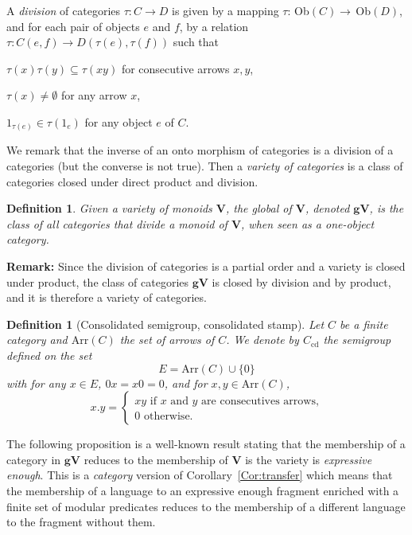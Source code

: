 \documentclass[submission,hidelink]{dmtcs-episciences}
\newtheorem{definition}[theorem]{Definition}
\newcommand{\V}{\mathbf{V}}
\newcommand{\gV}{\mathbf{gV}}
\newcommand{\cd}{\textrm{cd}}
\newcommand{\Ob}{$\,\textrm{Ob}$}
\newenvironment{conditions}
{\begin{list}{\rm (\theenumi)}{\noindent \usecounter{enumi}\setlength{\topsep}{2pt}\setlength{\partopsep}{0pt}\setlength{\itemsep}{2pt}\setlength{\parsep}{0pt}\setlength{\leftmargin}{2.5em}\setlength{\labelwidth}{1.5em}\setlength{\labelsep}{0.5em}\setlength{\listparindent}{0pt}\setlength{\itemindent}{0pt}}}{\end{list}}
\newcommand{\Arr}{\textrm{Arr}}
\begin{document}
		A \emph{division} of categories $\tau:C\to D$
		is given by a mapping $\tau:\Ob(C)\to \Ob(D)$,
		and for each pair of objects $e$ and $f$, by a relation $\tau: C(e,f)\to D(\tau(e),\tau(f))$
		such that
			\begin{conditions}
			\item $\tau(x)\tau(y)\subseteq\tau(xy)$ for consecutive arrows $x,y$,
			\item $\tau(x)\neq \emptyset$ for any arrow $x$,
			\item $1_{\tau(e)}\in\tau(1_e)$ for any object $e$ of $C$.
			\end{conditions}
	We remark that the inverse of an onto morphism of categories is a division of a categories (but the converse is not
	true).
	Then a \emph{variety of categories} is a class of categories closed under direct product and division.

	\begin{definition}
		Given a variety of monoids $\V$, the \emph{global} of $\V$, denoted $\gV$, is the class of all categories that divide a monoid of $\V$, when seen as a one-object category.
\end{definition}

	\noindent\textbf{Remark:} Since the division of categories is a partial order and a variety is closed under product, the class of categories $\gV$ is closed by division and by product, and it is therefore a variety of categories.

	\begin{definition}[Consolidated semigroup, consolidated stamp]
			Let $C$ be a finite category and $\Arr(C)$
			the set of arrows of $C$. We denote by $C_\cd$ the semigroup
			defined on the set
			$$E=\Arr(C) \cup \{0\}$$
			with   for any $x\in E$, $0x = x0 = 0$, and for $x,y\in \Arr(C)$,
			$$x.y=\begin{cases}
					xy\text{ if }x\text{ and }y\text{ are consecutives arrows,}\\
					0\text{ otherwise}.
					\end{cases}	$$
	\end{definition}
	The following proposition is a well-known result stating that the membership of a category
	in $\gV$ reduces to the membership of $\V$ is the variety is \emph{expressive enough}. This is a
	\emph{category} version of Corollary~\ref{Cor:transfer} which means that the membership of a language to an expressive enough fragment enriched with a finite set of modular predicates reduces to the membership of a different language to the fragment without them.
\end{document}
